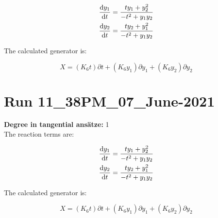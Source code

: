 \begin{align*}
\dv{y_{1}}{t}&=\frac{t y_{1} + y_{2}^{2}}{- t^{2} + y_{1} y_{2}}\\
\dv{y_{2}}{t}&=\frac{t y_{2} + y_{1}^{2}}{- t^{2} + y_{1} y_{2}}\\
\end{align*}

The calculated generator is:

\begin{equation}X=\left(K_{6} t\right)\partial t+\left(K_{6} y_{1}\right)\partial y_{1}+\left(K_{6} y_{2}\right)\partial y_{2}\end{equation}
\section*{Run 11\_38PM\_07\_June-2021}
\textbf{Degree in tangential ansätze:}	1\\
The reaction terms are:

\begin{align*}
\dv{y_{1}}{t}&=\frac{t y_{1} + y_{2}^{2}}{- t^{2} + y_{1} y_{2}}\\
\dv{y_{2}}{t}&=\frac{t y_{2} + y_{1}^{2}}{- t^{2} + y_{1} y_{2}}\\
\end{align*}

The calculated generator is:

\begin{equation}X=\left(K_{6} t\right)\partial t+\left(K_{6} y_{1}\right)\partial y_{1}+\left(K_{6} y_{2}\right)\partial y_{2}\end{equation}
